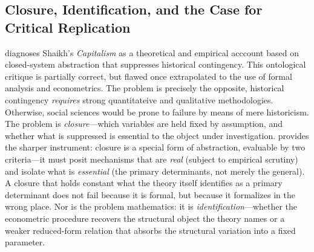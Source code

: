 \subsection{Closure, Identification, and the Case for Critical Replication}
\label{sec:case_for_cr}

\citet{Patomaki2017} diagnoses Shaikh's \emph{Capitalism} as a theoretical and empirical acccount based on closed-system abstraction that suppresses historical contingency. This ontological critique is partially correct, but flawed once extrapolated to the use of formal analysis and econometrics. The problem is precisely the opposite, historical contingency \emph{requires} strong quantitateive and qualitative methodologies. Otherwise, social sciences would be prone to failure by means of mere historicism. The problem is \emph{closure}---which variables are held fixed by assumption, and whether what is suppressed is essential to the object under investigation. \citet{Nikiforos2021closure} provides the sharper instrument: closure is a special form of abstraction, evaluable by two criteria---it must posit mechanisms that are \emph{real} (subject to empirical scrutiny) and isolate what is \emph{essential} (the primary determinants, not merely the general). A closure that holds constant what the theory itself identifies as a primary determinant does not fail because it is formal, but because it formalizes in the wrong place. Nor is the problem mathematics: it is \emph{identification}---whether the econometric procedure recovers the structural object the theory names or a weaker reduced-form relation that absorbs the structural variation into a fixed parameter.

